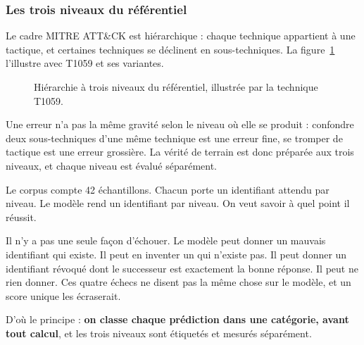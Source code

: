 \subsubsection{Les trois niveaux du référentiel}\label{sec:2-1}
Le cadre MITRE ATT\&CK est hiérarchique : chaque technique appartient à une tactique, et certaines techniques se déclinent en sous-techniques. La figure~\ref{fig:hierarchie} l'illustre avec T1059 et ses variantes.

\begin{figure}[htbp]
\centering
{}
\caption{Hiérarchie à trois niveaux du référentiel, illustrée par la technique T1059.}\label{fig:hierarchie}
\end{figure}

Une erreur n'a pas la même gravité selon le niveau où elle se produit : confondre deux sous-techniques d'une même technique est une erreur fine, se tromper de tactique est une erreur grossière. La vérité de terrain est donc préparée aux trois niveaux, et chaque niveau est évalué séparément.

Le corpus compte 42 échantillons. Chacun porte un identifiant attendu par niveau. Le modèle rend un identifiant par niveau. On veut savoir à quel point il réussit.

Il n'y a pas une seule façon d'échouer. Le modèle peut donner un mauvais identifiant qui existe. Il peut en inventer un qui n'existe pas. Il peut donner un identifiant révoqué dont le successeur est exactement la bonne réponse. Il peut ne rien donner. Ces quatre échecs ne disent pas la même chose sur le modèle, et un score unique les écraserait.

D'où le principe : \textbf{on classe chaque prédiction dans une catégorie, avant tout calcul}, et les trois niveaux sont étiquetés et mesurés séparément.

